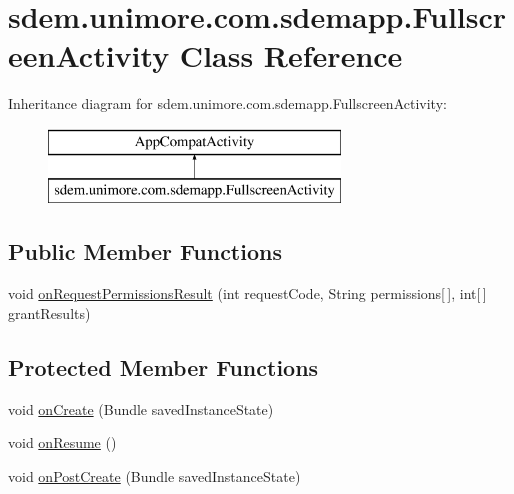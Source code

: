 \hypertarget{classsdem_1_1unimore_1_1com_1_1sdemapp_1_1_fullscreen_activity}{\section{sdem.\+unimore.\+com.\+sdemapp.\+Fullscreen\+Activity Class Reference}
\label{classsdem_1_1unimore_1_1com_1_1sdemapp_1_1_fullscreen_activity}
}
Inheritance diagram for sdem.\+unimore.\+com.\+sdemapp.\+Fullscreen\+Activity\+:\begin{figure}[H]
\begin{center}
\leavevmode
\includegraphics[height=2.000000cm]{classsdem_1_1unimore_1_1com_1_1sdemapp_1_1_fullscreen_activity}
\end{center}
\end{figure}
\subsection*{Public Member Functions}
\begin{DoxyCompactItemize}
\item 
void \hyperlink{classsdem_1_1unimore_1_1com_1_1sdemapp_1_1_fullscreen_activity_aa00cf64d5669932c3b4ca55e3dee382c}{on\+Request\+Permissions\+Result} (int request\+Code, String permissions\mbox{[}$\,$\mbox{]}, int\mbox{[}$\,$\mbox{]} grant\+Results)
\end{DoxyCompactItemize}
\subsection*{Protected Member Functions}
\begin{DoxyCompactItemize}
\item 
void \hyperlink{classsdem_1_1unimore_1_1com_1_1sdemapp_1_1_fullscreen_activity_aa47fc4234b35e26366da2aeded279ed4}{on\+Create} (Bundle saved\+Instance\+State)
\item 
void \hyperlink{classsdem_1_1unimore_1_1com_1_1sdemapp_1_1_fullscreen_activity_ab4610475ff6a0a0099971f041a95f5ba}{on\+Resume} ()
\item 
void \hyperlink{classsdem_1_1unimore_1_1com_1_1sdemapp_1_1_fullscreen_activity_a6ce6eebdc04c389cedbb9f2a86214b8a}{on\+Post\+Create} (Bundle saved\+Instance\+State)
\end{DoxyCompactItemize}


